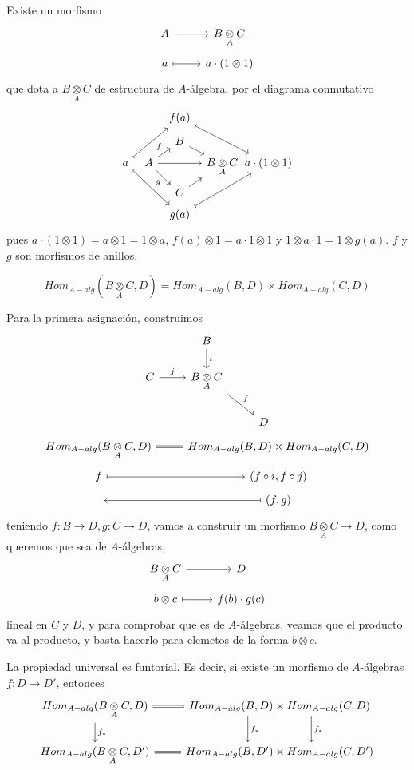 \begin{prop} Existe un morfismo 
    $$\bt A \arrow{r} & B \underset{A}{\otimes} C \\[-5mm] a \arrow[mapsto]{r} & a\cdot (1\otimes 1) \et$$
    que dota a $B \underset{A}{\otimes} C$ de estructura de $A$-\'algebra, por el diagrama conmutativo
    \[ %
    \begin{tikzcd}[row sep=tiny, column sep=tiny] 
        & & f(a) \arrow[mapsto]{rrdd} \\
        & & B \arrow{dr} \\
        a\arrow[mapsto]{rrdd}\arrow[mapsto]{rruu} & A \arrow{rr} \arrow{ru}{f} \arrow{rd}[swap]{g} & & B \underset{A}{\otimes} C &[-3mm] a\cdot (1\otimes 1)\\
        & & C \arrow{ru} \\
        & & g(a)\arrow[mapsto]{rruu} &
    \end{tikzcd}\]
    pues $a\cdot (1\otimes 1) = a\otimes 1 = 1\otimes a$, $f(a)\otimes 1 = a\cdot 1 \otimes 1$ y $1 \otimes a\cdot 1 = 1\otimes g(a)$. $f$ y $g$ son morfismos de anillos.
\end{prop}
\begin{propi}
    $$Hom_{A-alg}(B \underset{A}{\otimes} C, D) = Hom_{A-alg}(B,D) \times Hom_{A-alg}(C,D)$$
\end{propi}
\begin{dem} Para la primera asignaci\'on, construimos
    $$\bt & B \arrow{d}{i} \\  C \arrow{r}{j} & B \underset{A}{\otimes} C \arrow{rd}{f}\\ & & D \et$$
    $$\bt Hom_{A-alg}(B \underset{A}{\otimes} C, D) \arrow[equal]{r} & Hom_{A-alg}(B,D) \times Hom_{A-alg}(C,D) \\[-5mm] f \arrow[mapsto]{r} & (f\circ i , f\circ j) \\[-5mm] 
    \, & \arrow[mapsto]{l} (f,g) \et$$
    teniendo $f:B\to D, g:C \to D$, vamos a construir un morfismo $B \underset{A}{\otimes} C \longrightarrow D$, como queremos que sea de $A$-\'algebras,
    $$\bt B \underset{A}{\otimes} C \arrow{r} & D \\[-5mm] b\otimes c \arrow[mapsto]{r} &f(b) \cdot g(c) \et$$
    lineal en $C$ y $D$, y para comprobar que es de $A$-\'algebras, veamos que el producto va al producto, y basta hacerlo para elemetos de la forma $b\otimes c$. 
\end{dem}
\begin{prop}
    La propiedad universal es funtorial. Es decir, si existe un morfismo de $A$-\'algebras $f: D \longrightarrow D'$, entonces
    $$\bt Hom_{A-alg}(B \underset{A}{\otimes} C, D) \arrow{d}{f_*} \arrow[equal]{r} & Hom_{A-alg}(B,D) \times Hom_{A-alg}(C,D) \arrow[shift left=10mm]{d}{f_*} \arrow[shift right=10mm]{d}{f_*} \\ Hom_{A-alg}(B \underset{A}{\otimes} C, D') \arrow[equal]{r} & Hom_{A-alg}(B,D') \times Hom_{A-alg}(C,D') \et$$
\end{prop}
